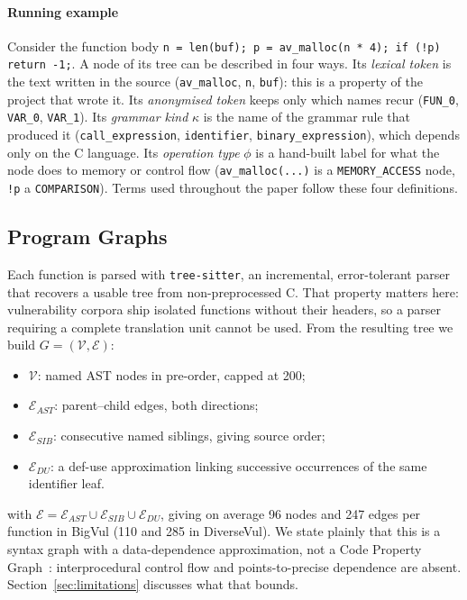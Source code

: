 \documentclass[pdflatex,sn-basic]{sn-jnl}
\theoremstyle{thmstyleone}%
\newcommand{\numbigvulEdges}{247}
\newcommand{\numbigvulNodes}{96}
\newcommand{\numdiversevulEdges}{285}
\newcommand{\numdiversevulNodes}{110}
\begin{document}
\paragraph{Running example} Consider the function body
\texttt{n = len(buf); p = av\_malloc(n * 4); if (!p) return -1;}.
A node of its tree can be described in four ways. Its \emph{lexical token} is
the text written in the source (\texttt{av\_malloc}, \texttt{n}, \texttt{buf}):
this is a property of the project that wrote it. Its \emph{anonymised token}
keeps only which names recur (\texttt{FUN\_0}, \texttt{VAR\_0},
\texttt{VAR\_1}). Its \emph{grammar kind} $\kappa$ is the name of the grammar
rule that produced it (\texttt{call\_expression}, \texttt{identifier},
\texttt{binary\_expression}), which depends only on the C language. Its
\emph{operation type} $\phi$ is a hand-built label for what the node does to
memory or control flow (\texttt{av\_malloc(...)} is a \texttt{MEMORY\_ACCESS}
node, \texttt{!p} a \texttt{COMPARISON}). Terms used throughout the paper
follow these four definitions.

\subsection{Program Graphs}
\label{sec:graph_construction}

Each function is parsed with \texttt{tree-sitter}, an incremental,
error-tolerant parser that recovers a usable tree from non-preprocessed C.
That property matters here: vulnerability corpora ship isolated functions
without their headers, so a parser requiring a complete translation unit
cannot be used. From the resulting tree we build $G = (\mathcal{V},
\mathcal{E})$:

\begin{itemize}
    \item $\mathcal{V}$: named AST nodes in pre-order, capped at 200;
    \item $\mathcal{E}_{AST}$: parent--child edges, both directions;
    \item $\mathcal{E}_{SIB}$: consecutive named siblings, giving source order;
    \item $\mathcal{E}_{DU}$: a def-use approximation linking successive
          occurrences of the same identifier leaf.
\end{itemize}

with $\mathcal{E} = \mathcal{E}_{AST} \cup \mathcal{E}_{SIB} \cup
\mathcal{E}_{DU}$, giving on average \numbigvulNodes{} nodes and \numbigvulEdges{} edges per
function in BigVul (\numdiversevulNodes{} and \numdiversevulEdges{} in DiverseVul). We state plainly that this is a syntax graph with a data-dependence
approximation, not a Code Property Graph~\citep{yamaguchi2014modeling}:
interprocedural control flow and points-to-precise dependence are absent.
Section~\ref{sec:limitations} discusses what that bounds.
\end{document}
